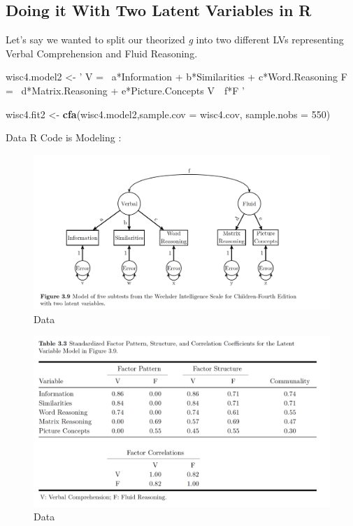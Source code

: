 \documentclass[]{book}
\newenvironment{Shaded}{\begin{snugshade}}{\end{snugshade}}
\newcommand{\KeywordTok}[1]{\textcolor[rgb]{0.13,0.29,0.53}{\textbf{#1}}}
\newcommand{\DataTypeTok}[1]{\textcolor[rgb]{0.13,0.29,0.53}{#1}}
\newcommand{\DecValTok}[1]{\textcolor[rgb]{0.00,0.00,0.81}{#1}}
\newcommand{\StringTok}[1]{\textcolor[rgb]{0.31,0.60,0.02}{#1}}
\newcommand{\NormalTok}[1]{#1}
\theoremstyle{definition}
\theoremstyle{definition}
\theoremstyle{definition}
\theoremstyle{remark}
\begin{document}
\subsection{Doing it With Two Latent Variables in
R}\label{doing-it-with-two-latent-variables-in-r}

Let's say we wanted to split our theorized \emph{g} into two different
LVs representing Verbal Comprehension and Fluid Reasoning.

\begin{Shaded}
\begin{Highlighting}[]
\NormalTok{wisc4.model2 <-}\StringTok{ '}
\StringTok{V =~ a*Information + b*Similarities + c*Word.Reasoning}
\StringTok{F =~ d*Matrix.Reasoning + e*Picture.Concepts}
\StringTok{V~~f*F}
\StringTok{'}

\NormalTok{wisc4.fit2 <-}\StringTok{ }\KeywordTok{cfa}\NormalTok{(wisc4.model2,}\DataTypeTok{sample.cov =}\NormalTok{ wisc4.cov, }\DataTypeTok{sample.nobs =} \DecValTok{550}\NormalTok{)}
\end{Highlighting}
\end{Shaded}

Data R Code is Modeling :

\begin{figure}
\centering
\includegraphics{img/beaupath14.png}
\caption{Data}
\end{figure}

\begin{figure}
\centering
\includegraphics{img/beaupath15.png}
\caption{Data}
\end{figure}
\end{document}
